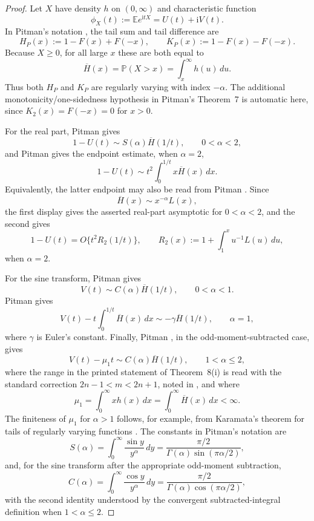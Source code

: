 \documentclass[aap,press]{apt} \volno{00} \partno{00}
\newcommand{\E}{\mathbb{E}}
\newcommand{\PP}{\mathbb{P}}
\renewcommand{\ii}{\mathrm{i}}
\newcommand{\1}{\mathbf{1}}
\numberwithin{equation}{section}
\begin{document}
\begin{proof}
Let $X$ have density $h$ on $(0,\infty)$ and characteristic function
\[
\phi_X(t):=\E e^{\ii tX}=U(t)+\ii V(t).
\]
In Pitman's notation \cite{Pitman1968}, the tail sum and tail difference are
\[
H_P(x):=1-F(x)+F(-x),\qquad K_P(x):=1-F(x)-F(-x).
\]
Because $X\ge0$, for all large $x$ these are both equal to
\[
\overline H(x)=\PP(X>x)=\int_x^\infty h(u)\,du.
\]
Thus both $H_P$ and $K_P$ are regularly varying with index $-\alpha$. The additional monotonicity/one-sidedness hypothesis in Pitman's Theorem~7 is automatic here, since $K_2(x)=F(-x)=0$ for $x>0$.

For the real part, Pitman \cite[Theorem~1]{Pitman1968} gives
\[
1-U(t)\sim S(\alpha)\overline H(1/t),\qquad 0<\alpha<2,
\]
and Pitman \cite[Theorem~3]{Pitman1968} gives the endpoint estimate, when $\alpha=2$,
\[
1-U(t)\sim t^2\int_0^{1/t}x\overline H(x)\,dx.
\]
Equivalently, the latter endpoint may also be read from Pitman \cite[Theorem~6(iii), $n=0$]{Pitman1968}. Since
\[
\overline H(x)\sim x^{-\alpha}L(x),
\]
the first display gives the asserted real-part asymptotic for $0<\alpha<2$, and the second gives
\[
1-U(t)=O\{t^2R_2(1/t)\},
\qquad
R_2(x):=1+\int_1^x u^{-1}L(u)\,du,
\]
when $\alpha=2$.

For the sine transform, Pitman \cite[Theorem~7(i)]{Pitman1968} gives
\[
V(t)\sim C(\alpha)\overline H(1/t),\qquad 0<\alpha<1.
\]
Pitman \cite[Theorem~7, case $m=1$]{Pitman1968} gives
\[
V(t)-t\int_0^{1/t}\overline H(x)\,dx
\sim -\gamma\overline H(1/t),
\qquad \alpha=1,
\]
where $\gamma$ is Euler's constant. Finally, Pitman \cite[Theorem~8(i), $n=1$]{Pitman1968}, in the odd-moment-subtracted case, gives
\[
V(t)-\mu_1t\sim C(\alpha)\overline H(1/t),
\qquad 1<\alpha\le2,
\]
where the range in the printed statement of Theorem~8(i) is read with the standard correction $2n-1<m<2n+1$, noted in \cite[Lemma~6.2, after (6.13)]{PitmanPitman2016}, and where
\[
\mu_1=\int_0^\infty xh(x)\,dx=\int_0^\infty \overline H(x)\,dx<\infty.
\]
The finiteness of $\mu_1$ for $\alpha>1$ follows, for example, from Karamata's theorem for tails of regularly varying functions \cite[Theorem~1.5.11(ii)]{Bingham_Goldie_Teugels_1987}. The constants in Pitman's notation are
\[
S(\alpha)=\int_0^\infty \frac{\sin y}{y^\alpha}\,dy
=\frac{\pi/2}{\Gamma(\alpha)\sin(\pi\alpha/2)},
\]
and, for the sine transform after the appropriate odd-moment subtraction,
\[
C(\alpha)=\int_0^\infty \frac{\cos y}{y^\alpha}\,dy
=\frac{\pi/2}{\Gamma(\alpha)\cos(\pi\alpha/2)},
\]
with the second identity understood by the convergent subtracted-integral definition when $1<\alpha\le2$.


\end{proof}
\end{document}
